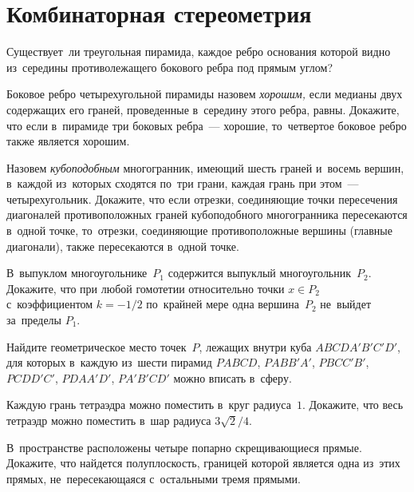 
\section*{Комбинаторная стереометрия}


\begin{problems}

\item
Существует~ли треугольная пирамида, каждое ребро основания которой видно
из~середины противолежащего бокового ребра под прямым углом?

\item
Боковое ребро четырехугольной пирамиды назовем \emph{хорошим,} если медианы
двух содержащих его граней, проведенные в~середину этого ребра, равны.
Докажите, что если в~пирамиде три боковых ребра~--- хорошие, то~четвертое
боковое ребро также является хорошим.

\item
Назовем \emph{кубоподобным} многогранник, имеющий шесть граней и~восемь вершин,
в~каждой из~которых сходятся по~три грани, каждая грань при этом~---
четырехугольник.
Докажите, что если отрезки, соединяющие точки пересечения диагоналей
противоположных граней кубоподобного многогранника пересекаются в~одной точке,
то~отрезки, соединяющие противоположные вершины (главные диагонали), также
пересекаются в~одной точке.

\item
В~выпуклом многоугольнике~$P_1$ содержится выпуклый многоугольник~$P_2$.
Докажите, что при любой гомотетии относительно точки $x \in P_2$
с~коэффициентом $k = -1 / 2$ по~крайней мере одна вершина~$P_2$ не~выйдет
за~пределы $P_1$.

\item
Найдите геометрическое место точек~$P$, лежащих внутри куба $ABCDA'B'C'D'$, для
которых в~каждую из~шести пирамид $PABCD$, $PABB'A'$, $PBCC'B'$, $PCDD'C'$,
$PDAA'D'$, $PA'B'CD'$ можно вписать в~сферу.

\item
Каждую грань тетраэдра можно поместить в~круг радиуса~$1$.
Докажите, что весь тетраэдр можно поместить в~шар радиуса
$3 \sqrt{2} / 4$.

\item
В~пространстве расположены четыре попарно скрещивающиеся прямые.
Докажите, что найдется полуплоскость, границей которой является одна из~этих
прямых, не~пересекающаяся с~остальными тремя прямыми.

\end{problems}


